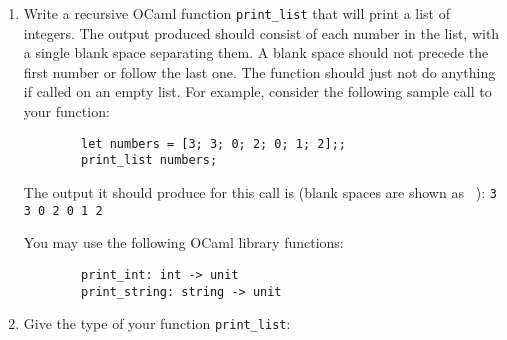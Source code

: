 \documentclass[11pt]{article}
\begin{document}
\begin{enumerate}
          \begin{enumerate}

            \addtolength{\itemsep}{16mm}

            \item Write a recursive OCaml function \texttt{print\_list} that
                  will print a list of integers.  The output produced should
                  consist of each number in the list, with a single blank
                  space separating them.  A blank space should not precede
                  the first number or follow the last one.  The function
                  should just not do anything if called on an empty list.
                  For example, consider the following sample call to your
                  function:

                  \medskip

                  \begin{centering}

                    \begin{BVerbatim}
        let numbers = [3; 3; 0; 2; 0; 1; 2];;
        print_list numbers;
                    \end{BVerbatim}

                  \end{centering}

                  \medskip

                  The output it should produce for this call is
                  (blank spaces are shown as \verb*@ @):
                  \verb*@3 3 0 2 0 1 2@

                  \smallskip

                  You may use the following OCaml library functions:%

                  \medskip

                  \begin{centering}

                    \begin{BVerbatim}
        print_int: int -> unit
        print_string: string -> unit
                    \end{BVerbatim}

                  \end{centering}

                  \bigskip


            \item Give the type of your function \texttt{print\_list}:%
                  \hspace{2mm}\ans[3.5in]

          \end{enumerate}

          \vspace{-2.5mm}

  \end{enumerate}
\end{document}
